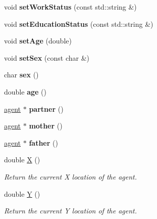 \begin{DoxyCompactItemize}
\item 
\mbox{\label{classagent_a66caa39215e0fba347152cbf7190c85e}} 
void {\bfseries set\+Work\+Status} (const std\+::string \&)
\item 
\mbox{\label{classagent_afbfba46faf7104f44f19dfef8dd72585}} 
void {\bfseries set\+Education\+Status} (const std\+::string \&)
\item 
\mbox{\label{classagent_ad5a0596438a813a44840ad542416dc50}} 
void {\bfseries set\+Age} (double)
\item 
\mbox{\label{classagent_aaeb64899916c47b42bfdfbc43427d9a8}} 
void {\bfseries set\+Sex} (const char \&)
\item 
\mbox{\label{classagent_a0c0cbe17943c2fc044905fe877b14ade}} 
char {\bfseries sex} ()
\item 
\mbox{\label{classagent_a1f8475f933cfae0199d73c108faff1ad}} 
double {\bfseries age} ()
\item 
\mbox{\label{classagent_a1e9532f2be4b2b08ee7cdd2a7761237b}} 
\mbox{\hyperlink{classagent}{agent}} $\ast$ {\bfseries partner} ()
\item 
\mbox{\label{classagent_a6853ae2b9f4b349bd748105699dd43e4}} 
\mbox{\hyperlink{classagent}{agent}} $\ast$ {\bfseries mother} ()
\item 
\mbox{\label{classagent_a1c29803a7627d786ff50d6f39b81a285}} 
\mbox{\hyperlink{classagent}{agent}} $\ast$ {\bfseries father} ()
\item 
double \mbox{\hyperlink{classagent_a312bd1aeb3c660f43bb3bf5a8f0764e7}{X}} ()
\begin{DoxyCompactList}\small\item\em Return the current X location of the agent. \end{DoxyCompactList}\item 
double \mbox{\hyperlink{classagent_a56b8ea7b9138c5e4b92530d454e247ad}{Y}} ()
\begin{DoxyCompactList}\small\item\em Return the current Y location of the agent. \end{DoxyCompactList}\item 

\end{DoxyCompactItemize}
